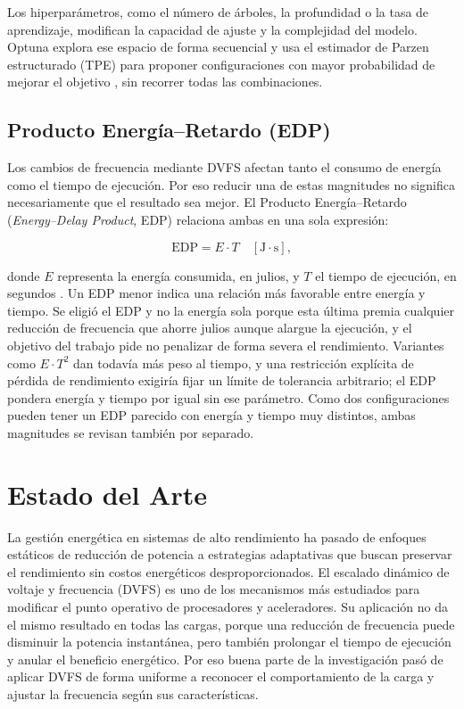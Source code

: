 Los hiperparámetros, como el número de árboles, la profundidad o la tasa de aprendizaje, modifican la capacidad de ajuste y la complejidad del modelo. Optuna explora ese espacio de forma secuencial \cite{Akiba2019} y usa el estimador de Parzen estructurado (TPE) para proponer configuraciones con mayor probabilidad de mejorar el objetivo \cite{Bergstra2011}, sin recorrer todas las combinaciones.

\subsection{Producto Energía--Retardo (EDP)}
\label{sec:marco-edp}

Los cambios de frecuencia mediante DVFS afectan tanto el consumo de energía como el tiempo de ejecución. Por eso reducir una de estas magnitudes no significa necesariamente que el resultado sea mejor. El Producto Energía--Retardo (\textit{Energy--Delay Product}, EDP) relaciona ambas en una sola expresión:

\begin{equation}
\mathrm{EDP} = E \cdot T \quad [\mathrm{J\cdot s}],
\label{eq:edp}
\end{equation}

donde $E$ representa la energía consumida, en julios, y $T$ el tiempo de ejecución, en segundos \cite{Laros2013}. Un EDP menor indica una relación más favorable entre energía y tiempo. Se eligió el EDP y no la energía sola porque esta última premia cualquier reducción de frecuencia que ahorre julios aunque alargue la ejecución, y el objetivo del trabajo pide no penalizar de forma severa el rendimiento. Variantes como $E\cdot T^2$ dan todavía más peso al tiempo, y una restricción explícita de pérdida de rendimiento exigiría fijar un límite de tolerancia arbitrario; el EDP pondera energía y tiempo por igual sin ese parámetro. Como dos configuraciones pueden tener un EDP parecido con energía y tiempo muy distintos, ambas magnitudes se revisan también por separado.


\section{Estado del Arte}
\label{sec:estado-del-arte}

La gestión energética en sistemas de alto rendimiento ha pasado de enfoques estáticos de reducción de potencia a estrategias adaptativas que buscan preservar el rendimiento sin costos energéticos desproporcionados. El escalado dinámico de voltaje y frecuencia (DVFS) es uno de los mecanismos más estudiados para modificar el punto operativo de procesadores y aceleradores. Su aplicación no da el mismo resultado en todas las cargas, porque una reducción de frecuencia puede disminuir la potencia instantánea, pero también prolongar el tiempo de ejecución y anular el beneficio energético. Por eso buena parte de la investigación pasó de aplicar DVFS de forma uniforme a reconocer el comportamiento de la carga y ajustar la frecuencia según sus características.

